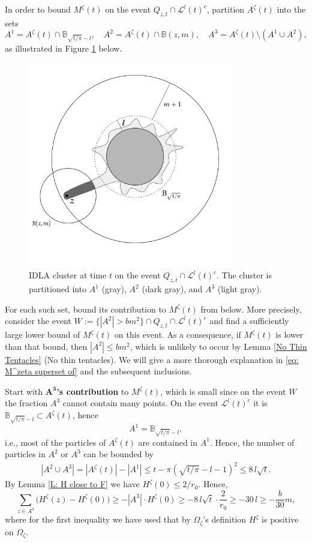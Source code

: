 \documentclass[11pt]{article}
\makeatletter
\renewenvironment{proof}[1][\proofname]{
   \par\pushQED{\qed}\normalfont
   \topsep6\p@\@plus6\p@\relax
   \trivlist\item[\hskip\labelsep\bfseries#1\@addpunct{.}]
   \ignorespaces
}{
   \popQED\endtrivlist\@endpefalse
}
\numberwithin{equation}{section}
\def\OZ{\Omega_{\zeta}}
\def\AZT{A^{\zeta}(t)}
\def\MZT{M^{\zeta}(t)}
\def\LLT{\mathcal{L}^{l}(t)}
\makeatother
\begin{document}
\begin{proof}[Proof of Lemma \ref{Early Points Imply Late Points}]
  In order to bound $\MZT$ on the event
  $Q_{z,t} \cap \LLT^c$, partition $\AZT$ into the sets
  $$
    A^1 = \AZT \cap \mathbb{B}_{\sqrt{t/\pi} - l}, \quad
    A^2 = \AZT \cap \mathbb{B}(z, m), \quad 
    A^3 = \AZT \setminus (A^1 \cup A^2),
  $$ 
  as illustrated in Figure \ref{F: IDLA cluster on event} below.
  \begin{figure}[H]
    \captionsetup{width=.9\linewidth}
    \centering
    \includegraphics[width=9cm, height=9cm]{Lemma12(3).png}
    \vspace*{-5mm}
    \caption{IDLA cluster at time $t$ on the event 
      $Q_{z,t} \cap \LLT^c$. The cluster is partitioned into 
      $A^1$ (gray), $A^2$ (dark gray), and $A^3$ (light gray).}
    \label{F: IDLA cluster on event}
  \end{figure}
  For each such set, bound its contribution to $\MZT$ from below.
  More precisely, consider the event $W := \{|A^2| > bm^2 \} \cap Q_{z,t} \cap \LLT^c$ and 
  find a sufficiently large lower bound of $\MZT$ on this event. 
  As a consequence, if $\MZT$ is lower than that bound, 
  then $|A^2| \leq bm^2$, which is unlikely to occur by 
  Lemma \ref{No Thin Tentacles} (No thin tentacles). 
  We will give a more thorough explanation in \eqref{eq: M^zeta superset of} and 
  the subsequent inclusions.
  
  Start with $\boldsymbol{A^3}$\textbf{'s contribution} to $\MZT$, 
  which is small since on the event $W$ the fraction 
  $A^3$ cannot contain many points. On the event $\LLT^c$ it is 
  $\mathbb{B}_{\sqrt{t/\pi} - l} \subset \AZT$, hence
  $$
  A^1 = \mathbb{B}_{\sqrt{t/\pi} - l},
  $$
  i.e., most of the particles of $\AZT$ are contained in $A^1$. 
  Hence, the number of particles in $A^2$ or $A^3$ can be bounded by
  \begin{align*}
    |A^2 \cup A^3| 
      = |\AZT| - |A^1| 
      \leq t - \pi(\sqrt{t/ \pi} - l - 1)^2 
      \leq 8 \, l \sqrt{t}.
  \end{align*}
  By Lemma \ref{L: H close to F} we have $H^{\zeta}(0) \leq 2/r_0$. Hence, 
  $$
    \sum_{z \in A^3} \big( H^{\zeta}(z) - H^{\zeta}(0) \big)
    \geq -|A^3| \cdot H^{\zeta}(0) 
    \geq - 8 \, l \sqrt{t} \cdot \frac{2}{r_0}
      \geq - 30 \, l
      \geq -\frac{b}{30} m,
  $$
  where for the first inequality we have used that by $\OZ$'s definition
  $H^{\zeta}$ is positive on $\OZ$. 


\end{proof}
\end{document}
